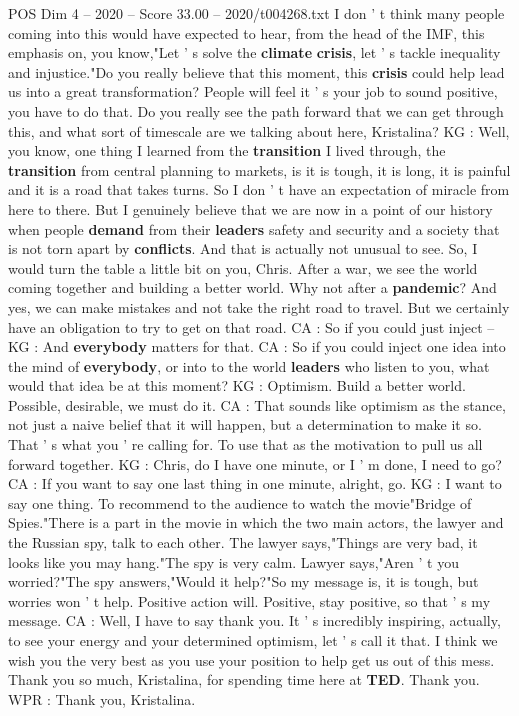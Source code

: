 \begin{textsample}{POS Dim 4 – 2020 – Score 33.00 – 2020/t004268.txt}
I don ' t think many people coming into this would have expected to hear, from the head of the IMF, this emphasis on, you know,"Let ' s solve the \textbf{climate} \textbf{crisis}, let ' s tackle inequality and injustice."Do you really believe that this moment, this \textbf{crisis} could help lead us into a great transformation?
People will feel it ' s your job to sound positive, you have to do that.
Do you really see the path forward that we can get through this, and what sort of timescale are we talking about here, Kristalina?
KG : Well, you know, one thing I learned from the \textbf{transition} I lived through, the \textbf{transition} from central planning to markets, is it is tough, it is long, it is painful and it is a road that takes turns.
So I don ' t have an expectation of miracle from here to there.
But I genuinely believe that we are now in a point of our history when people \textbf{demand} from their \textbf{leaders} safety and security and a society that is not torn apart by \textbf{conflicts}.
And that is actually not unusual to see.
So, I would turn the table a little bit on you, Chris.
After a war, we see the world coming together and building a better world.
Why not after a \textbf{pandemic}?
And yes, we can make mistakes and not take the right road to travel.
But we certainly have an obligation to try to get on that road.
CA : So if you could just inject -- KG : And \textbf{everybody} matters for that.
CA : So if you could inject one idea into the mind of \textbf{everybody}, or into to the world \textbf{leaders} who listen to you, what would that idea be at this moment?
KG : Optimism.
Build a better world.
Possible, desirable, we must do it.
CA : That sounds like optimism as the stance, not just a naive belief that it will happen, but a determination to make it so.
That ' s what you ' re calling for.
To use that as the motivation to pull us all forward together.
KG : Chris, do I have one minute, or I ' m done, I need to go?
CA : If you want to say one last thing in one minute, alright, go.
KG : I want to say one thing.
To recommend to the audience to watch the movie"Bridge of Spies."There is a part in the movie in which the two main actors, the lawyer and the Russian spy, talk to each other.
The lawyer says,"Things are very bad, it looks like you may hang."The spy is very calm.
Lawyer says,"Aren ' t you worried?"The spy answers,"Would it help?"So my message is, it is tough, but worries won ' t help.
Positive action will.
Positive, stay positive, so that ' s my message.
CA : Well, I have to say thank you.
It ' s incredibly inspiring, actually, to see your energy and your determined optimism, let ' s call it that.
I think we wish you the very best as you use your position to help get us out of this mess.
Thank you so much, Kristalina, for spending time here at \textbf{TED}.
Thank you.
WPR : Thank you, Kristalina.

\end{textsample}
